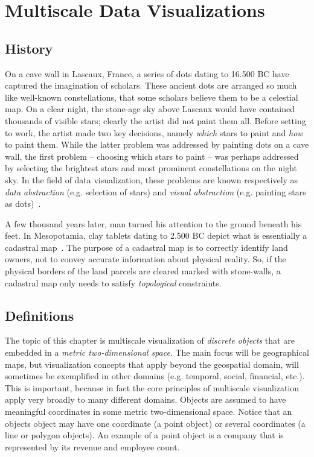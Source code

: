 \documentclass[11pt, oneside]{report}   	%
\begin{document}
\chapter{Multiscale Data Visualizations}

\section{History}
\label{sec:history}
On a cave wall in Lascaux, France, a series of dots dating to 16.500 BC have captured the imagination of scholars. These ancient dots are arranged so much like well-known constellations, that some scholars believe them to be a celestial map. On a clear night, the stone-age sky above Lascaux would have contained thousands of visible stars; clearly the artist did not paint them all. Before setting to work, the artist made two key decisions, namely \emph{which} stars to paint and \emph{how} to paint them. While the latter problem was addressed by painting dots on a cave wall, the first problem -- choosing which stars to paint -- was perhaps addressed by selecting the brightest stars and most prominent constellations on the night sky. In the field of data visualization, these problems are known respectively as \emph{data abstraction} (e.g. selection of stars) and \emph{visual abstraction} (e.g. painting stars as dots)~\cite{stolte2003multiscale}.

A few thousand years later, man turned his attention to the ground beneath his feet. In Mesopotamia, clay tablets dating to 2.500 BC depict what is essentially a cadastral map~\cite{harley1987cartography}. The purpose of a cadastral map is to correctly identify land owners, not to convey accurate information about physical reality. So, if the physical borders of the land parcels are cleared marked with stone-walls, a cadastral map only needs to satisfy \emph{topological} constraints. 

\section{Definitions}

The topic of this chapter is multiscale visualization of \emph{discrete objects} that are embedded in a \emph{metric two-dimensional space}. The main focus will be geographical maps, but visualization concepts that apply beyond the geospatial domain, will sometimes be exemplified in other domains (e.g. temporal, social, financial, etc.). This is important, because in fact the core principles of multiscale visualization apply very broadly to many different domains. Objects are assumed to have meaningful coordinates in some metric two-dimensional space. Notice that an objects object may have one coordinate (a point object) or several coordinates (a line or polygon objects). An example of a point object is a company that is represented by its revenue and employee count.
\end{document}
